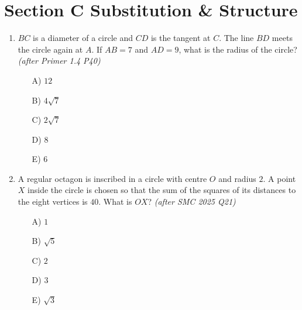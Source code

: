 \documentclass[11pt,a4paper]{article}
\begin{document}
\section*{Section C \quad Substitution \& Structure}
\begin{enumerate}

\item \begin{minipage}[t]{0.60\linewidth}
$BC$ is a diameter of a circle and $CD$ is the tangent at $C$. The line $BD$ meets the circle again at $A$. If $AB=7$ and $AD=9$, what is the radius of the circle? \textit{\small(after Primer 1.4 P40)}
\begin{itemize}
\item[A)] $12$
\item[B)] $4\sqrt7$
\item[C)] $2\sqrt7$
\item[D)] $8$
\item[E)] $6$
\end{itemize}
\end{minipage}\hfill
\begin{minipage}[t]{0.36\linewidth}
\vspace{0pt}
\centering
{}
\end{minipage}


\item A regular octagon is inscribed in a circle with centre $O$ and radius $2$. A point $X$ inside the circle is chosen so that the sum of the squares of its distances to the eight vertices is $40$. What is $OX$? \textit{\small(after SMC 2025 Q21)}
\begin{itemize}
\item[A)] $1$
\item[B)] $\sqrt5$
\item[C)] $2$
\item[D)] $3$
\item[E)] $\sqrt3$
\end{itemize}


\end{enumerate}
\end{document}
